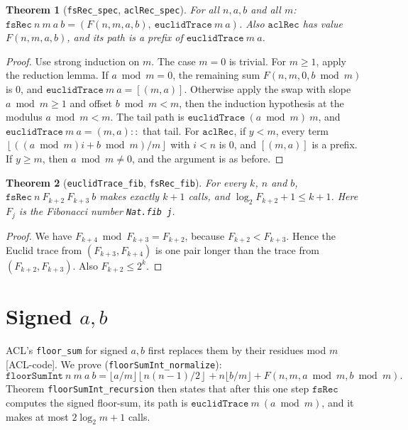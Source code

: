 \documentclass[11pt]{article}
\newtheorem{theorem}{Theorem}
\theoremstyle{definition}
\newcommand{\fl}[1]{\left\lfloor #1 \right\rfloor}
\begin{document}
\begin{theorem}[\texttt{fsRec\_spec}, \texttt{aclRec\_spec}]
For all $n,a,b$ and all $m$: $\mathtt{fsRec}\ n\ m\ a\ b=(F(n,m,a,b),\ \mathtt{euclidTrace}\ m\ a)$.
Also $\mathtt{aclRec}$ has value $F(n,m,a,b)$, and its path is a prefix of
$\mathtt{euclidTrace}\ m\ a$.
\end{theorem}
\begin{proof}
Use strong induction on $m$. The case $m=0$ is trivial. For $m\ge1$, apply the reduction lemma. If
$a\bmod m=0$, the remaining sum $F(n,m,0,b\bmod m)$ is $0$, and
$\mathtt{euclidTrace}\ m\ a=[(m,a)]$. Otherwise apply the swap with slope $a\bmod m\ge1$ and offset
$b\bmod m<m$, then the induction hypothesis at the modulus $a\bmod m<m$. The tail path is
$\mathtt{euclidTrace}\ (a\bmod m)\ m$, and $\mathtt{euclidTrace}\ m\ a=(m,a)::$ that tail. For
$\mathtt{aclRec}$, if $y<m$, every term $\fl{((a\bmod m)i+b\bmod m)/m}$ with $i<n$ is $0$, and
$[(m,a)]$ is a prefix. If $y\ge m$, then $a\bmod m\neq0$, and the argument is as before.
\end{proof}

\begin{theorem}[\texttt{euclidTrace\_fib}, \texttt{fsRec\_fib}]
For every $k$, $n$ and $b$, $\mathtt{fsRec}\ n\ F_{k+2}\ F_{k+3}\ b$ makes exactly $k+1$ calls, and
$\log_2F_{k+2}+1\le k+1$. Here $F_j$ is the Fibonacci number \texttt{Nat.fib j}.
\end{theorem}
\begin{proof}
We have $F_{k+4}\bmod F_{k+3}=F_{k+2}$, because $F_{k+2}<F_{k+3}$. Hence the Euclid trace from
$(F_{k+3},F_{k+4})$ is one pair longer than the trace from $(F_{k+2},F_{k+3})$. Also $F_{k+2}\le2^k$.
\end{proof}

\section{Signed $a,b$}\label{sec:signed}
ACL's \texttt{floor\_sum} for signed $a,b$ first replaces them by their residues mod $m$ [ACL-code].
We prove (\texttt{floorSumInt\_normalize}):
\[\mathtt{floorSumInt}\ n\ m\ a\ b=\lfloor a/m\rfloor\fl{n(n-1)/2}+n\lfloor b/m\rfloor+F(n,m,a\bmod m,b\bmod m).\]
Theorem \texttt{floorSumInt\_recursion} then states that after this one step $\mathtt{fsRec}$
computes the signed floor-sum, its path is $\mathtt{euclidTrace}\ m\ (a\bmod m)$, and it makes at
most $2\log_2m+1$ calls.
\end{document}
